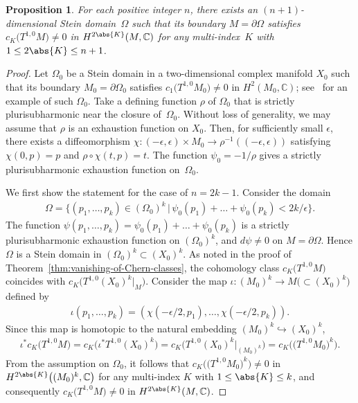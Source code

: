 \documentclass[10pt,a4paper]{amsart}
\numberwithin{equation}{section}
\newtheorem{Proposition}[Theorem]{Proposition}
 { \theoremstyle{definition}
\newtheorem{Remark}[Theorem]{Remark} }
\begin{document}
\begin{Proposition} \label{prop:optimal-degree}For each positive integer $n$, there exists an $(n + 1)$-dimensional Stein domain~$\Omega$ such that its boundary $M = \partial \Omega$ satisfies $c_{K}\big(T^{1,0}M\big) \neq 0$ in $H^{2 \abs{K}}(M, \mathbb{C})$ for any multi-index~$K$ with $1 \leq 2 \abs{K} \leq n + 1$.
\end{Proposition}

\begin{proof}Let $\Omega_{0}$ be a Stein domain in a two-dimensional complex manifold $X_{0}$ such that its boundary $M_{0} = \partial \Omega_{0}$ satisfies $c_{1}\big(T^{1, 0} M_{0}\big) \neq 0$ in $H^{2}(M_{0}, \mathbb{C})$; see~\cite[Theorem~6.2]{Etnyre-Ozbagci08} for an example of such $\Omega_{0}$. Take a defining function $\rho$ of $\Omega_{0}$ that is strictly plurisubharmonic near the closure of~$\Omega_{0}$. Without loss of generality, we may assume that $\rho$ is an exhaustion function on $X_{0}$. Then, for sufficiently small $\epsilon$, there exists a diffeomorphism $\chi \colon (- \epsilon, \epsilon) \times M_{0} \to \rho^{- 1}((- \epsilon, \epsilon))$ satisfying $\chi(0, p) = p$ and $\rho \circ \chi (t, p) = t$. The function $\psi_{0} = - 1 / \rho$ gives a strictly plurisubharmonic exhaustion function on~$\Omega_{0}$.

We first show the statement for the case of $n = 2 k - 1$. Consider the domain
\begin{gather*}
\Omega= \big\{(p_{1}, \dots , p_{k}) \in (\Omega_{0})^{k} \,|\, \psi_{0}(p_{1}) + \dots + \psi_{0}(p_{k}) < 2 k / \epsilon \big\}.
\end{gather*}
The function $\psi(p_{1}, \dots , p_{k}) = \psi_{0}(p_{1}) + \dots + \psi_{0}(p_{k})$ is a strictly plurisubharmonic exhaustion function on $(\Omega_{0})^{k}$, and $d \psi \neq 0$ on $M = \partial \Omega$. Hence $\Omega$ is a Stein domain in $(\Omega_{0})^{k} \subset (X_{0})^{k}$. As noted in the proof of Theorem~\ref{thm:vanishing-of-Chern-classes}, the cohomology class $c_{K}\big(T^{1,0}M\big)$ coincides with $c_{K}\big(T^{1, 0} (X_{0})^{k} |_{M}\big)$. Consider the map $\iota \colon (M_{0})^{k} \to M \big({\subset} (X_{0})^{k}\big)$ defined by
\begin{gather*}
\iota(p_{1}, \dots , p_{k})= (\chi(- \epsilon / 2, p_{1}), \dots , \chi(- \epsilon / 2, p_{k})).
\end{gather*}
Since this map is homotopic to the natural embedding $(M_{0})^{k} \hookrightarrow (X_{0})^{k}$,
\begin{gather*}
\iota^{*} c_{K}\big(T^{1,0}M\big)= c_{K}\big(\iota^{*} T^{1, 0} (X_{0})^{k}\big)= c_{K}\big(T^{1, 0} (X_{0})^{k} |_{(M_{0})^{k}}\big)= c_{K}\big(\big(T^{1, 0} M_{0}\big)^{k}\big).
\end{gather*}
From the assumption on $\Omega_{0}$, it follows that $c_{K}\big(\big(T^{1, 0} M_{0}\big)^{k}\big) \neq 0$ in $H^{2 \abs{K}}\big((M_{0})^{k}, \mathbb{C}\big)$ for any multi-index $K$ with $1 \leq \abs{K} \leq k$, and consequently $c_{K}\big(T^{1,0}M\big) \neq 0$ in $H^{2 \abs{K}}(M, \mathbb{C})$.


\end{proof}
\end{document}
